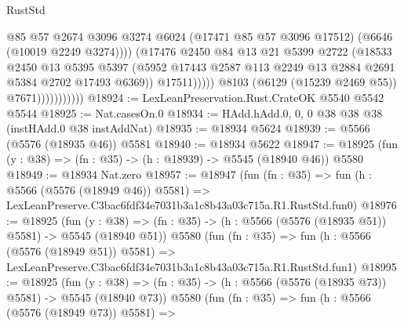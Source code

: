 \begin{lexlean}{RustStd}
\begin{coremodule}
                                      @85
                                      @57
                                      @2674
                                      @3096
                                      @3274
                                      @6024
                                      (@17471 @85 @57 @3096 @17512)
                                      (@6646 (@10019 @2249 @3274))))
                                  (@17476
                                    @2450
                                    @84
                                    @13
                                    @21
                                    @5399
                                    @2722
                                    (@18533
                                      @2450
                                      @13
                                      @5395
                                      @5397
                                      (@5952
                                        @17443
                                        @2587
                                        @113
                                        @2249
                                        @13
                                        @2884
                                        @2691
                                        @5384
                                        @2702
                                        @17493
                                        @6369))
                                    @17511)))))
                          @8103
                          (@6129 (@15239 @2469 @55))
                          @7671)))))))))))
@18924 := LexLeanPreservation.Rust.CrateOK @5540 @5542 @5544
@18925 := Nat.casesOn.{0}
@18934 := HAdd.hAdd.{0, 0, 0} @38 @38 @38 (instHAdd.{0} @38 instAddNat)
@18935 := @18934 @5624
@18939 := @5566 (@5576 (@18935 @46)) @5581
@18940 := @18934 @5622
@18947 := @18925 (fun (y : @38) => (fn : @35) -> (h : @18939) -> @5545 (@18940 @46)) @5580
@18949 := @18934 Nat.zero
@18957 := @18947
    (fun (fn : @35) =>
    fun (h : @5566 (@5576 (@18949 @46)) @5581) =>
    LexLeanPreserve.C3bac6fdf34e7031b3a1c8b43a03c715a.R1.RustStd.fun0)
@18976 := @18925
    (fun (y : @38) => (fn : @35) -> (h : @5566 (@5576 (@18935 @51)) @5581) -> @5545 (@18940 @51))
    @5580
    (fun (fn : @35) =>
    fun (h : @5566 (@5576 (@18949 @51)) @5581) =>
    LexLeanPreserve.C3bac6fdf34e7031b3a1c8b43a03c715a.R1.RustStd.fun1)
@18995 := @18925
    (fun (y : @38) => (fn : @35) -> (h : @5566 (@5576 (@18935 @73)) @5581) -> @5545 (@18940 @73))
    @5580
    (fun (fn : @35) =>
    fun (h : @5566 (@5576 (@18949 @73)) @5581) =>

\end{coremodule}
\end{lexlean}

